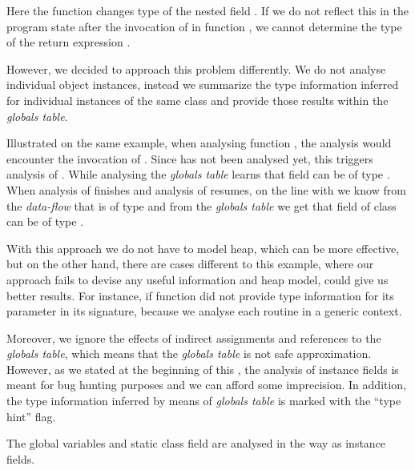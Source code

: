         Here the function  changes type of the nested field 
        . If we do not reflect this in the program 
        state after the invocation of  in 
        function , we cannot determine the type of 
        the return expression .
        
        However, we decided to approach this problem differently. 
        We do not analyse individual object instances, 
        instead we summarize the type information inferred 
        for individual instances of the same class and provide 
        those results within the \emph{globals table}.
        
        Illustrated on the same example, when analysing function 
        , the analysis would encounter the invocation 
        of . Since  has not been analysed yet, 
        this triggers analysis of . While analysing 
         the \emph{globals table} learns that 
        field  can be of type . When analysis 
        of  finishes and analysis of  resumes, 
        on the line with  we know from the 
        \emph{data-flow} that  is of type  and 
        from the \emph{globals table} we get that field  
        of class  can be of type .
        
        With this approach we do not have to model heap, 
        which can be more effective, but on the other hand, 
        there are cases different to this example, where our 
        approach fails to devise any useful information 
        and heap model, could give us 
        better results. For instance, if function  
        did not provide type information for its parameter 
        in its signature, because we analyse each routine 
        in a generic context.
                
        Moreover, we ignore the effects of indirect assignments 
        and references to the \emph{globals table}, which means 
        that the \emph{globals table} is not safe approximation. 
        However, as we stated at the beginning of this \wsection{}, 
        the analysis of instance fields is meant for bug hunting 
        purposes and we can afford some imprecision. In addition, 
        the type information inferred by means of \emph{globals table} 
        is marked with the ``type hint'' flag.
        
        The global variables and static class field are analysed 
        in the way as instance fields.
        
